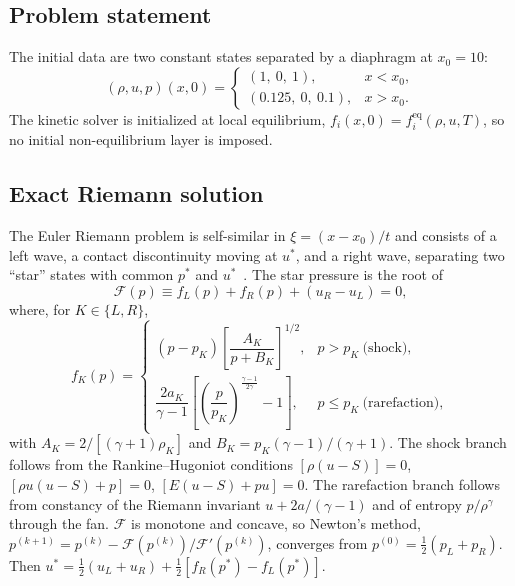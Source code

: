 \documentclass[11pt]{article}
\theoremstyle{remark}
\newcommand{\feq}{f^{\mathrm{eq}}}
\begin{document}
\subsection{Problem statement}
The initial data are two constant states separated by a diaphragm at $x_0=10$:
\begin{equation}
  (\rho,u,p)(x,0) =
  \begin{cases} (1,\ 0,\ 1), & x < x_0,\\ (0.125,\ 0,\ 0.1), & x > x_0. \end{cases}
\end{equation}
The kinetic solver is initialized at local equilibrium, $f_i(x,0) = \feq_i(\rho,u,T)$,
so no initial non-equilibrium layer is imposed.

\subsection{Exact Riemann solution}
\label{sec:riemann}
The Euler Riemann problem is self-similar in $\xi = (x-x_0)/t$ and consists of a
left wave, a contact discontinuity moving at $u^*$, and a right wave, separating
two ``star'' states with common $p^*$ and $u^*$~\citep{Toro2009}.  The star pressure
is the root of
\begin{equation}
  \mathcal F(p) \equiv f_L(p) + f_R(p) + (u_R - u_L) = 0,
  \label{eq:pressure_function}
\end{equation}
where, for $K\in\{L,R\}$,
\begin{equation}
  f_K(p) =
  \begin{cases}
    (p-p_K)\left[\dfrac{A_K}{p + B_K}\right]^{1/2}, & p > p_K\ \text{(shock)},\\[10pt]
    \dfrac{2a_K}{\gamma-1}\left[\left(\dfrac{p}{p_K}\right)^{\frac{\gamma-1}{2\gamma}} - 1\right], & p \le p_K\ \text{(rarefaction)},
  \end{cases}
\end{equation}
with $A_K = 2/[(\gamma+1)\rho_K]$ and $B_K = p_K(\gamma-1)/(\gamma+1)$.
The shock branch follows from the Rankine--Hugoniot conditions
$[\rho(u-S)] = 0$, $[\rho u(u-S) + p] = 0$, $[E(u-S) + pu] = 0$.  The rarefaction
branch follows from constancy of the Riemann invariant $u + 2a/(\gamma-1)$ and of
entropy $p/\rho^\gamma$ through the fan.  $\mathcal F$ is monotone and concave, so
Newton's method,
$p^{(k+1)} = p^{(k)} - \mathcal F(p^{(k)})/\mathcal F'(p^{(k)})$, converges from
$p^{(0)} = \tfrac12(p_L+p_R)$.  Then $u^* = \tfrac12(u_L+u_R) + \tfrac12[f_R(p^*) - f_L(p^*)]$.
\end{document}
